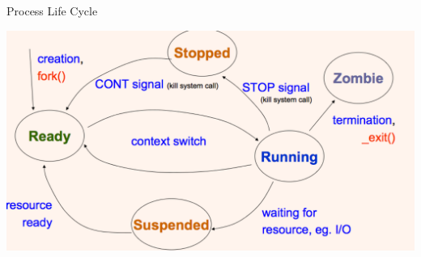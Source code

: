 \documentclass[11pt,a4paper]{article}
\theoremstyle{definition}
\begin{document}
\begin{tcolorbox}
	\textsf{Process Life Cycle}
	
	\includegraphics[scale=0.3]{m1/processLifeCycle}
	\centering
\end{tcolorbox}
\end{document}
